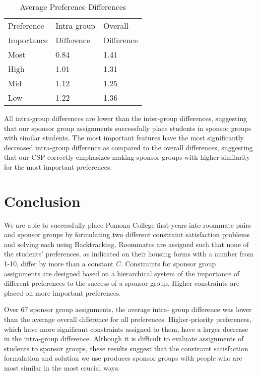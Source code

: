 \documentclass[letterpaper]{article}
\begin{document}
\begin{table}[h]
\begin{center}
\begin{tabular}{|l|l|l|}
\hline
Preference & Intra-group & Overall  \\
Importance & Difference & Difference \\
\hline
Most & 0.84 & 1.41 \\
High & 1.01 & 1.31 \\
Mid & 1.12 & 1.25 \\
Low & 1.22 & 1.36 \\
\hline
\end{tabular}
\end{center}
\caption{Average Preference Differences}
\end{table}


All intra-group differences are lower than the inter-group differences, suggesting that our sponsor group assignments successfully place students in sponsor groups with similar students. The most important features have the most significantly decreased intra-group difference as compared to the overall differences, suggesting that our CSP correctly emphasizes making sponsor groups with higher similarity for the most important preferences.

\section{Conclusion}

We are able to successfully place Pomona College first-years into roommate pairs and sponsor groups by formulating two different constraint satisfaction problems and solving each using Backtracking. Roommates are assigned such that none of the students' preferences, as indicated on their housing forms with a number from 1-10, differ by more than a constant $C$. Constraints for sponsor group assignments are designed based on a hierarchical system of the importance of different preferences to the success of a sponsor group. Higher constraints are placed on more important preferences.

Over 67 sponsor group assignments, the average intra-
group difference was lower than the average overall difference for all preferences. Higher-priority preferences, which have more significant constraints assigned to them, have a larger decrease in the intra-group difference. Although it is difficult to evaluate assignments of students to sponsor groups, these results suggest that the constraint satisfaction formulation and solution we use produces sponsor groups with people who are most similar in the most crucial ways.
\end{document}
